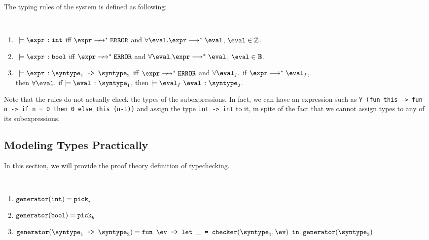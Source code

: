 The typing rules of the system is defined as following:

\begin{definition}
  \label{def_typingM}
  \ \par
  \begin{enumerate}
      \item $\ \models \hastype{\expr}{\tint}$ iff $\expr \nsmallsteps[] \eerror$ and $\forall \eval. \expr \smallsteps[] \eval$, $\eval \in \mathbb{Z}$.
      \item $\ \models \hastype{\expr}{\tbool}$ iff $\expr \nsmallsteps[] \eerror$ and $\forall \eval.\expr \smallsteps[] \eval$, $\eval \in \mathbb{B}$.
      \item $\ \models \hastype{\expr}{\mkfun{\syntype_1}{\syntype_2}}$ iff $\expr \nsmallsteps[] \eerror$ and $\forall \eval_f.$ if $\expr \smallsteps[] \eval_f$, \\ then $\forall{\eval}.$ if $\models \hastype{\eval}{\syntype_1}$, then $\models \hastype{\eval_f\ \eval}{\syntype_2}$.
   \end{enumerate}
\end{definition}

Note that the rules do not actually check the types of the subexpressions. In 
fact, we can have an expression such as \texttt{Y}\ 
\texttt{(fun this -> fun n -> if n = 0 then 0 else this (n-1))} and 
assign the type \texttt{int -> int} to it, in spite of the fact that
we cannot assign types to any of its subexpressions.

\subsection{Modeling Types Practically}

In this section, we will provide the proof theory definition of typechecking.

\begin{definition}
  \label{def_genCore}
  \ \par 
  \begin{enumerate}
    \item $\texttt{generator}(\texttt{int}) = \texttt{pick}_i$
    \item $\texttt{generator}(\texttt{bool}) = \texttt{pick}_b$
    \item $\mkgen{\mkfun{\syntype_1}{\syntype_2}} = \mkfunv{\ev}{\letin{\_}{\mkche{\syntype_1}{\ev}}{\mkgen{\syntype_2}}}$
  \end{enumerate}
\end{definition}

